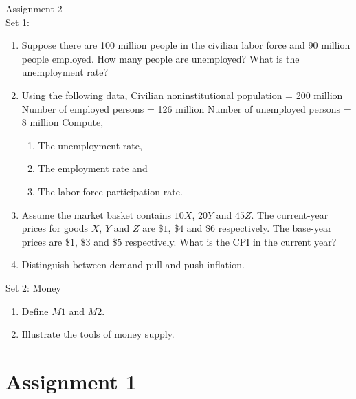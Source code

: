 \documentclass[12pt]{article}
\begin{document}
\newpage
{\large Assignment 2}\\
{\large Set 1:}
\begin{enumerate}
	\item Suppose there are 100 million people in the civilian labor force and 90 million people employed. How many people are unemployed? What is the unemployment rate?
	\item Using the following data,
	      \indent Civilian noninstitutional population = 200 million
	      \indent Number of employed persons = 126 million
	      \indent Number of unemployed persons = 8 million
	      Compute,
	      \begin{enumerate}
		      \item The unemployment rate,
		      \item The employment rate and
		      \item The labor force participation rate.
	      \end{enumerate}
	\item Assume the market basket contains $ 10X $, $ 20Y $ and $ 45Z $. The current-year prices for goods $ X $, $ Y $ and $ Z $ are $ \$1 $, $ \$4 $ and $ \$6 $ respectively. The base-year prices are $ \$1 $, $ \$3 $ and $ \$5 $ respectively. What is the CPI in the current year?
	\item Distinguish between demand pull and push inflation.
\end{enumerate}
{\large Set 2: Money}
\begin{enumerate}
	\item Define $ M1 $ and $ M2 $.
	\item Illustrate the tools of money supply.
\end{enumerate}
\newpage
\section{Assignment 1}
\end{document}
